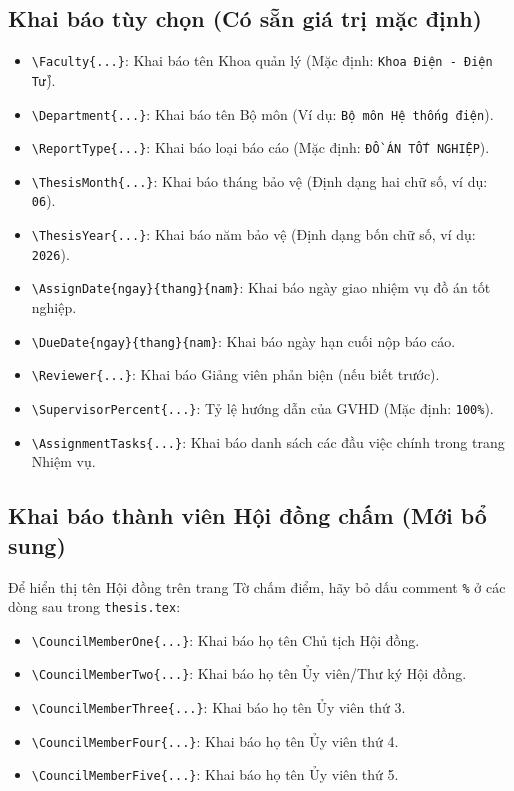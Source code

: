 \subsection{Khai báo tùy chọn (Có sẵn giá trị mặc định)}
\begin{itemize}
  \item \verb|\Faculty{...}|: Khai báo tên Khoa quản lý (Mặc định: \texttt{Khoa Điện - Điện Tử}).
  \item \verb|\Department{...}|: Khai báo tên Bộ môn (Ví dụ: \texttt{Bộ môn Hệ thống điện}).
  \item \verb|\ReportType{...}|: Khai báo loại báo cáo (Mặc định: \texttt{ĐỒ ÁN TỐT NGHIỆP}).
  \item \verb|\ThesisMonth{...}|: Khai báo tháng bảo vệ (Định dạng hai chữ số, ví dụ: \texttt{06}).
  \item \verb|\ThesisYear{...}|: Khai báo năm bảo vệ (Định dạng bốn chữ số, ví dụ: \texttt{2026}).
  \item \verb|\AssignDate{ngay}{thang}{nam}|: Khai báo ngày giao nhiệm vụ đồ án tốt nghiệp.
  \item \verb|\DueDate{ngay}{thang}{nam}|: Khai báo ngày hạn cuối nộp báo cáo.
  \item \verb|\Reviewer{...}|: Khai báo Giảng viên phản biện (nếu biết trước).
  \item \verb|\SupervisorPercent{...}|: Tỷ lệ hướng dẫn của GVHD (Mặc định: \texttt{100\%}).
  \item \verb|\AssignmentTasks{...}|: Khai báo danh sách các đầu việc chính trong trang Nhiệm vụ.
\end{itemize}

\subsection{Khai báo thành viên Hội đồng chấm (Mới bổ sung)}
Để hiển thị tên Hội đồng trên trang Tờ chấm điểm, hãy bỏ dấu comment \texttt{\%} ở các dòng sau trong \texttt{thesis.tex}:
\begin{itemize}
  \item \verb|\CouncilMemberOne{...}|: Khai báo họ tên Chủ tịch Hội đồng.
  \item \verb|\CouncilMemberTwo{...}|: Khai báo họ tên Ủy viên/Thư ký Hội đồng.
  \item \verb|\CouncilMemberThree{...}|: Khai báo họ tên Ủy viên thứ 3.
  \item \verb|\CouncilMemberFour{...}|: Khai báo họ tên Ủy viên thứ 4.
  \item \verb|\CouncilMemberFive{...}|: Khai báo họ tên Ủy viên thứ 5.
\end{itemize}

